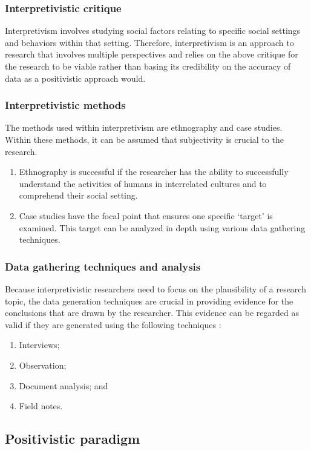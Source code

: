 \subsubsection{Interpretivistic critique}
Interpretivism involves studying social factors relating to specific social settings and behaviors within that setting. Therefore, interpretivism is an approach to research that involves multiple perspectives and relies on the above critique for the research to be viable rather than basing its credibility on the accuracy of data as a positivistic approach would.
\subsubsection{Interpretivistic methods}
The methods used within interpretivism are ethnography and case studies. Within these methods, it can be assumed that subjectivity is crucial to the research. 
\begin{enumerate}[label=\roman*.]
	\item Ethnography is successful if the researcher has the ability to successfully understand the activities of humans in interrelated cultures and to comprehend their social setting.
	\item Case studies have the focal point that ensures one specific ‘target’ is examined. This target can be analyzed in depth using various data gathering techniques.
\end{enumerate}

\subsubsection{Data gathering techniques and analysis}
Because interpretivistic researchers need to focus on the plausibility of a research topic, the data generation techniques are crucial in providing evidence for the conclusions that are drawn by the researcher. This evidence can be regarded as valid if they are generated using the following techniques \cite{OatesJ2006}:
\begin{enumerate}[label=\roman*.]
	\item Interviews;
	\item Observation;
	\item Document analysis; and
	\item Field notes.
\end{enumerate}

\subsection{Positivistic paradigm}
